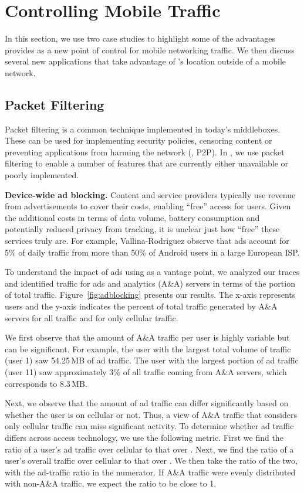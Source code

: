 \section{Controlling Mobile Traffic}
\label{sec:control}
In this section, we use two case studies to highlight some of the 
advantages \meddle provides as a new point of control 
for mobile networking traffic. We then discuss several new applications 
that take advantage of \meddle's location outside of a mobile network.

\subsection{Packet Filtering}
\label{sec:filtering}
Packet filtering is a common technique implemented in 
today's middleboxes. These can be used for implementing 
security policies, censoring content or preventing applications 
from harming the network (\eg, P2P). In \meddle, we use 
packet filtering to enable a number of features that are 
currently either unavailable or poorly implemented.

\noindent\textbf{Device-wide ad blocking.} Content and service providers 
typically use revenue from advertisements to cover their costs, enabling 
``free'' access for users. Given the additional costs in terms of data volume, 
battery consumption and potentially reduced privacy from tracking, it is unclear 
just how ``free'' these services truly are. For example, Vallina-Rodriguez \etal \cite{Vallina-rodriguez:2012:AdCache} observe
that ads account for 5\% of daily traffic from more than 50\% of
Android users in a large European ISP. 

To understand the impact of ads using \meddle as a vantage point, we 
analyzed our traces and identified traffic for ads and analytics (A\&A) servers 
in terms of the portion of total traffic. Figure~\ref{fig:adblocking} presents our 
results. The x-axis represents users and the y-axis indicates the percent of 
total traffic generated by A\&A servers for all traffic and for only cellular traffic. 

We first observe that the amount of A\&A traffic per user is highly variable but can be 
significant. For example, the user with the largest total volume of traffic (user 1) saw 
54.25\,MB of ad traffic. The user with the largest portion of ad traffic (user 11) saw 
approximately 3\% of all traffic coming from A\&A servers, which corresponds to 8.3\,MB. 

Next, we observe that the amount of ad traffic can differ significantly 
based on whether the user is on cellular or not. Thus, a view of A\&A 
traffic that considers only cellular traffic can miss significant activity. 
To determine whether ad traffic differs across access technology, we use 
the following metric. First we find the ratio of a user's ad traffic over cellular 
to that over \wifi. Next, we find the ratio of a user's overall traffic over cellular 
to that over \wifi. We then take the ratio of the two, with the ad-traffic ratio 
in the numerator. If A\&A traffic were evenly distributed with non-A\&A traffic, 
we expect the ratio to be close to 1.

